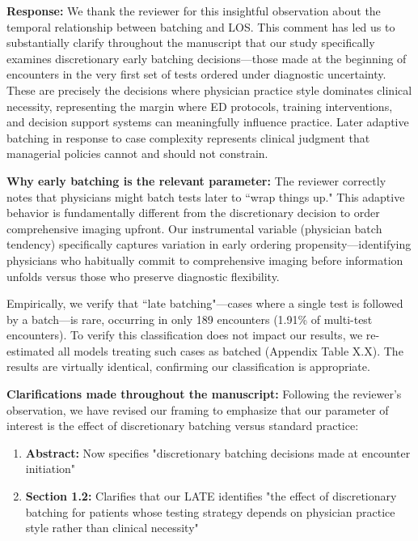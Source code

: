 \documentclass[11pt]{article}
\newcommand{\1}{\hbox{\rm 1\kern-.35em 1}}
\begin{document}
{\noindent\textbf{Response:} \color{blue}We thank the reviewer for this insightful observation about the temporal relationship between batching and LOS. This comment has led us to substantially clarify throughout the manuscript that our study specifically examines discretionary early batching decisions—those made at the beginning of encounters in the very first set of tests ordered under diagnostic uncertainty. These are precisely the decisions where physician practice style dominates clinical necessity, representing the margin where ED protocols, training interventions, and decision support systems can meaningfully influence practice. Later adaptive batching in response to case complexity represents clinical judgment that managerial policies cannot and should not constrain.

\textbf{Why early batching is the relevant parameter:} The reviewer correctly notes that physicians might batch tests later to ``wrap things up." This adaptive behavior is fundamentally different from the discretionary decision to order comprehensive imaging upfront. Our instrumental variable (physician batch tendency) specifically captures variation in early ordering propensity—identifying physicians who habitually commit to comprehensive imaging before information unfolds versus those who preserve diagnostic flexibility.

Empirically, we verify that ``late batching"—cases where a single test is followed by a batch—is rare, occurring in only 189 encounters (1.91\% of multi-test encounters). To verify this classification does not impact our results, we re-estimated all models treating such cases as batched (Appendix Table X.X). The results are virtually identical, confirming our classification is appropriate.

\textbf{Clarifications made throughout the manuscript:} Following the reviewer's observation, we have revised our framing to emphasize that our parameter of interest is the effect of discretionary batching versus standard practice:

\begin{enumerate}
\item \textbf{Abstract:} Now specifies "discretionary batching decisions made at encounter initiation"

\item \textbf{Section 1.2:} Clarifies that our LATE identifies "the effect of discretionary batching for patients whose testing strategy depends on physician practice style rather than clinical necessity"


\end{enumerate}}
\end{document}
